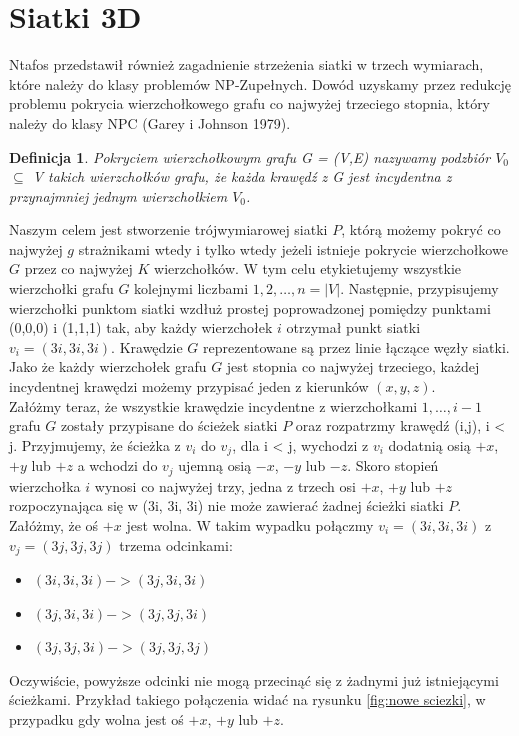 \documentclass[brudnopis]{xmgr}
\newtheorem{Definicja}{Definicja} \theoremstyle{definition}
\begin{document}
 \section{Siatki 3D}
 	Ntafos przedstawił również zagadnienie strzeżenia siatki w trzech wymiarach, które należy do klasy problemów NP-Zupełnych. Dowód uzyskamy przez redukcję problemu pokrycia wierzchołkowego grafu co najwyżej trzeciego stopnia, który należy do klasy NPC (Garey i Johnson 1979).
\begin{Definicja}
	Pokryciem wierzchołkowym grafu \textnormal{G = (V,E)} nazywamy podzbiór \textnormal{$V_0$ $\subseteq$ V} takich wierzchołków grafu, że każda krawędź z \textnormal{G} jest incydentna z przynajmniej jednym wierzchołkiem $V_0$.
\end{Definicja}
Naszym celem jest stworzenie trójwymiarowej siatki $P$, którą możemy pokryć co najwyżej $g$ strażnikami wtedy i tylko wtedy jeżeli istnieje pokrycie wierzchołkowe $G$ przez co najwyżej $K$ wierzchołków.
W tym celu etykietujemy wszystkie wierzchołki grafu $G$ kolejnymi liczbami $1,2,\ldots,n = |V|$. Następnie, przypisujemy wierzchołki punktom siatki wzdłuż prostej poprowadzonej pomiędzy punktami (0,0,0) i (1,1,1) tak, aby każdy wierzchołek $i$ otrzymał punkt siatki $v_i = (3i, 3i, 3i)$. Krawędzie $G$ reprezentowane są przez linie łączące węzły siatki. Jako że każdy wierzchołek grafu $G$ jest stopnia co najwyżej trzeciego, każdej incydentnej krawędzi możemy przypisać jeden z kierunków $(x,y,z)$.
\\\indent Załóżmy teraz, że wszystkie krawędzie incydentne z wierzchołkami $1,\ldots,i-1$ grafu $G$ zostały przypisane do ścieżek siatki $P$ oraz rozpatrzmy krawędź (i,j), i < j. Przyjmujemy, że ścieżka z $v_i$ do $v_j$, dla i < j, wychodzi z $v_i$ dodatnią osią $+x$, $+y$ lub $+z$ a wchodzi do $v_j$ ujemną osią $-x$, $-y$ lub $-z$. Skoro stopień wierzchołka $i$ wynosi co najwyżej trzy, jedna z trzech osi $+x$, $+y$ lub $+z$ rozpoczynająca się w (3i, 3i, 3i) nie może zawierać żadnej ścieżki siatki $P$. Załóżmy, że oś $+x$ jest wolna. W takim wypadku połączmy $v_i = (3i, 3i, 3i)$ z $v_j = (3j, 3j, 3j)$ trzema odcinkami:
\begin{itemize}
	\item $(3i, 3i, 3i) -> (3j, 3i, 3i)$
	\item $(3j, 3i, 3i) -> (3j, 3j, 3i)$
	\item $(3j, 3j, 3i) -> (3j, 3j, 3j)$
\end{itemize}
Oczywiście, powyższe odcinki nie mogą przecinąć się z żadnymi już istniejącymi ścieżkami. Przykład takiego połączenia widać na rysunku \ref{fig:nowe sciezki}, w przypadku gdy wolna jest oś $+x$, $+y$ lub $+z$.
\end{document}
